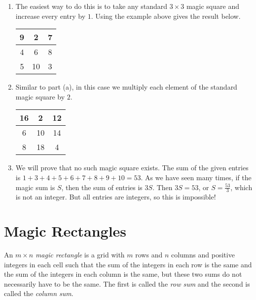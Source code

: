 \documentclass[11pt]{article}
\begin{document}
\begin{solution}
\begin{enumerate}[label=(\alph*)]
\item The easiest way to do this is to take any standard $3 \times 3$ magic square and increase every entry by $1$.
Using the example above gives the result below.
\begin{center}
\begin{tabular}{|c|c|c|}
\hline
9 & 2 & 7 \\ \hline
4 & 6 & 8 \\ \hline
5 & 10 & 3 \\ \hline
\end{tabular}
\end{center}

\item Similar to part (a), in this case we multiply each element of the standard magic square by $2$.
\begin{center}
\begin{tabular}{|c|c|c|}
\hline
16 & 2 & 12 \\ \hline
6 & 10 & 14 \\ \hline
8 & 18 & 4 \\ \hline
\end{tabular}
\end{center}

\item We will prove that no such magic square exists. The sum of the given entries is $1+3+4+5+6+7+8+9+10=53$.
As we have seen many times, if the magic sum is $S$, then the sum of entries is $3S$. Then $3S = 53$, or 
$S = \frac{53}{3}$, which is not an integer. But all entries are integers, so this is impossible!
\end{enumerate}
\end{solution}


\section{Magic Rectangles}

\begin{definition}
An $m \times n$ \textit{magic rectangle} is a grid with $m$ rows and $n$ columns and positive integers in each cell such that
the sum of the integers in each row is the same and the sum of the integers in each column is the same,
but these two sums do not necessarily have to be the same.
The first is called the \textit{row sum} and the second is called the \textit{column sum}.
\end{definition}
\end{document}

